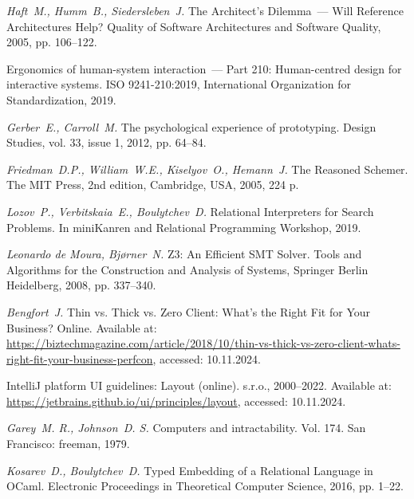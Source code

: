 {\em Haft~M., Humm~B., Siedersleben~J.} The Architect's Dilemma~--- Will Reference Architectures Help? Quality of Software Architectures and Software Quality, 2005, pp. 106--122.



Ergonomics of human-system interaction~--- Part 210: Human-centred design for interactive
systems. ISO 9241-210:2019, International Organization for Standardization, 2019. %

{\em Gerber~E., Carroll~M.} The psychological experience of prototyping. Design Studies, vol. 33, issue 1, 2012, pp. 64--84. %

{\em Friedman~D.P., William~W.E., Kiselyov~O., Hemann~J.} The Reasoned Schemer. The MIT Press, 2nd edition, Cambridge, USA, 2005, 224 p.

{\em Lozov~P., Verbitskaia~E., Boulytchev~D.} Relational Interpreters for Search Problems. In miniKanren and Relational Programming Workshop, 2019.

{\em Leonardo de Moura, Bj{\o}rner~N.} Z3: An Efficient SMT Solver. Tools and Algorithms for the Construction and Analysis of Systems, Springer Berlin Heidelberg, 2008, pp. 337--340.

{\em Bengfort~J.} Thin vs. Thick vs. Zero Client: What's the Right Fit for Your Business? Online. Available at:
\url{https://biztechmagazine.com/article/2018/10/thin-vs-thick-vs-zero-client-whats-right-fit-your-business-perfcon}, accessed: 10.11.2024.

IntelliJ platform UI guidelines: Layout (online). \JetBrains{} s.r.o., 2000--2022. Available at: \url{https://jetbrains.github.io/ui/principles/layout}, accessed: 10.11.2024.

{\em Garey~M. R.,  Johnson~D. S.} Computers and intractability. Vol. 174. San Francisco: freeman, 1979.

{\em Kosarev~D., Boulytchev~D.} Typed Embedding of a Relational Language in OCaml. Electronic Proceedings in Theoretical Computer Science, 2016, pp. 1--22.

